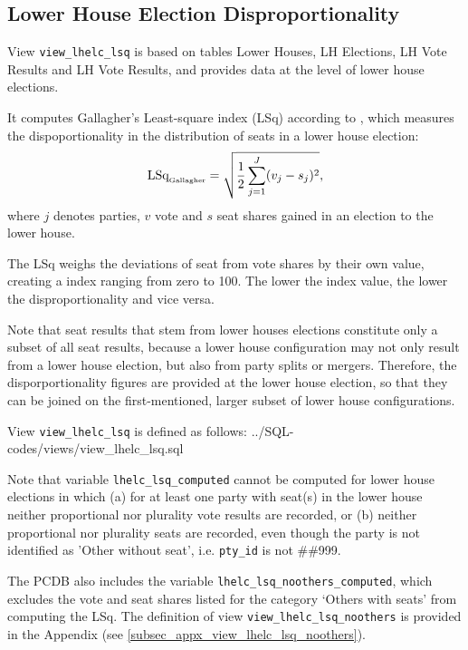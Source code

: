 \subsection{Lower House Election Disproportionality}\label{subsec_view_lhelc_lsq}

View \texttt{view\_lhelc\_lsq} is based on tables Lower Houses, LH Elections, LH Vote Results and LH Vote Results, and provides data at the level of lower house elections.

It computes Gallagher's Least-square index (LSq) according to \citet{Gallagher1991}, which measures the dispoportionality in the distribution of seats in a lower house election: 
\begin{equation}\label{LSq_equation}
\mbox{LSq}_{\mbox{\tiny Gallagher}}=\sqrt{\frac{1}{2}\sum\limits_{j=1}^{J} (v_{j}-s_{j})^{2}},
\end{equation}
where $j$ denotes parties, $v$ vote and $s$ seat shares gained in an election to the lower house. 

The LSq weighs the deviations of seat from vote shares by their own value, creating a index ranging from zero to 100. 
The lower the index value, the lower the disproportionality and vice versa. 

Note that seat results that stem from lower houses elections constitute only a subset of all seat results,
because a lower house configuration may not only result from a lower house election, but also from party splits or mergers.
Therefore, the disporportionality figures are provided at the lower house election, so that they can be joined on the first-mentioned, larger subset of lower house configurations.


View \texttt{view\_lhelc\_lsq} is defined as follows:
%
{../SQL-codes/views/view_lhelc_lsq.sql}

Note that variable \texttt{lhelc\_lsq\_computed} cannot be computed for lower house elections in which (a) for at least one party with seat(s) in the lower house neither proportional nor plurality vote results are recorded, or (b) neither proportional nor plurality seats are recorded, even though the party is not identified as 'Other without seat', i.e. \texttt{pty\_id} is not \#\#999.

The PCDB also includes the variable \texttt{lhelc\_lsq\_noothers\_computed}, which excludes the vote and seat shares listed for the category `Others with seats' from computing the LSq. 
The definition of view \texttt{view\_lhelc\_lsq\_noothers} is provided in the Appendix (see \ref{subsec_appx_view_lhelc_lsq_noothers}).